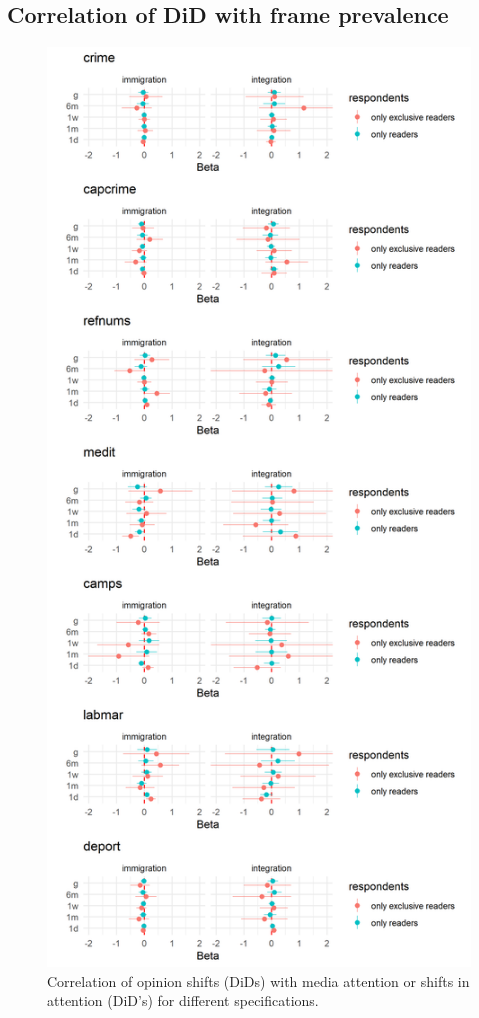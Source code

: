 \documentclass{article}
\begin{document}
\subsection{Correlation of DiD with frame prevalence}
\begin{figure}[!ht]
    \centering
    \includegraphics[width=\textwidth]{paper/vis/effectplot_frames.png}
    \caption{Correlation of opinion shifts (DiDs) with media attention or shifts in attention (DiD's) for different specifications.}
    \label{fig:did_corr}
\end{figure}
\end{document}
